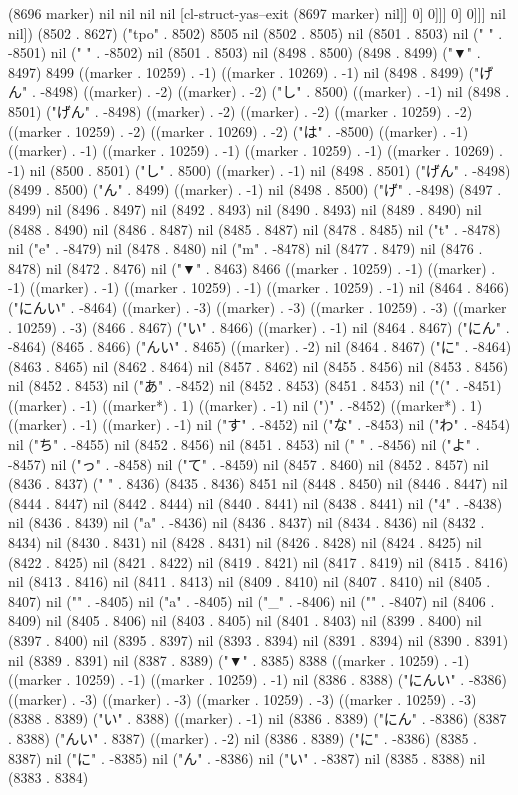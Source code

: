 {{(8696 marker) nil nil nil nil [cl-struct-yas--exit (8697 marker) nil]] 0] 0]]] 0] 0]]] nil nil]) (8502 . 8627) ("tpo" . 8502) 8505 nil (8502 . 8505) nil (8501 . 8503) nil ("
" . -8501) nil (" " . -8502) nil (8501 . 8503) nil (8498 . 8500) (8498 . 8499) ("▼" . 8497) 8499 ((marker . 10259) . -1) ((marker . 10269) . -1) nil (8498 . 8499) ("げん" . -8498) ((marker) . -2) ((marker) . -2) ("し" . 8500) ((marker) . -1) nil (8498 . 8501) ("げん" . -8498) ((marker) . -2) ((marker) . -2) ((marker . 10259) . -2) ((marker . 10259) . -2) ((marker . 10269) . -2) ("は" . -8500) ((marker) . -1) ((marker) . -1) ((marker . 10259) . -1) ((marker . 10259) . -1) ((marker . 10269) . -1) nil (8500 . 8501) ("し" . 8500) ((marker) . -1) nil (8498 . 8501) ("げん" . -8498) (8499 . 8500) ("ん" . 8499) ((marker) . -1) nil (8498 . 8500) ("げ" . -8498) (8497 . 8499) nil (8496 . 8497) nil (8492 . 8493) nil (8490 . 8493) nil (8489 . 8490) nil (8488 . 8490) nil (8486 . 8487) nil (8485 . 8487) nil (8478 . 8485) nil ("t" . -8478) nil ("e" . -8479) nil (8478 . 8480) nil ("m" . -8478) nil (8477 . 8479) nil (8476 . 8478) nil (8472 . 8476) nil ("▼" . 8463) 8466 ((marker . 10259) . -1) ((marker) . -1) ((marker) . -1) ((marker . 10259) . -1) ((marker . 10259) . -1) nil (8464 . 8466) ("にんい" . -8464) ((marker) . -3) ((marker) . -3) ((marker . 10259) . -3) ((marker . 10259) . -3) (8466 . 8467) ("い" . 8466) ((marker) . -1) nil (8464 . 8467) ("にん" . -8464) (8465 . 8466) ("んい" . 8465) ((marker) . -2) nil (8464 . 8467) ("に" . -8464) (8463 . 8465) nil (8462 . 8464) nil (8457 . 8462) nil (8455 . 8456) nil (8453 . 8456) nil (8452 . 8453) nil ("あ" . -8452) nil (8452 . 8453) (8451 . 8453) nil ("(" . -8451) ((marker) . -1) ((marker*) . 1) ((marker) . -1) nil (")" . -8452) ((marker*) . 1) ((marker) . -1) ((marker) . -1) nil ("す" . -8452) nil ("な" . -8453) nil ("わ" . -8454) nil ("ち" . -8455) nil (8452 . 8456) nil (8451 . 8453) nil (" " . -8456) nil ("よ" . -8457) nil ("っ" . -8458) nil ("て" . -8459) nil (8457 . 8460) nil (8452 . 8457) nil (8436 . 8437) (" " . 8436) (8435 . 8436) 8451 nil (8448 . 8450) nil (8446 . 8447) nil (8444 . 8447) nil (8442 . 8444) nil (8440 . 8441) nil (8438 . 8441) nil ("4" . -8438) nil (8436 . 8439) nil ("a" . -8436) nil (8436 . 8437) nil (8434 . 8436) nil (8432 . 8434) nil (8430 . 8431) nil (8428 . 8431) nil (8426 . 8428) nil (8424 . 8425) nil (8422 . 8425) nil (8421 . 8422) nil (8419 . 8421) nil (8417 . 8419) nil (8415 . 8416) nil (8413 . 8416) nil (8411 . 8413) nil (8409 . 8410) nil (8407 . 8410) nil (8405 . 8407) nil ("}" . -8405) nil ("a" . -8405) nil ("_" . -8406) nil ("{" . -8407) nil (8406 . 8409) nil (8405 . 8406) nil (8403 . 8405) nil (8401 . 8403) nil (8399 . 8400) nil (8397 . 8400) nil (8395 . 8397) nil (8393 . 8394) nil (8391 . 8394) nil (8390 . 8391) nil (8389 . 8391) nil (8387 . 8389) ("▼" . 8385) 8388 ((marker . 10259) . -1) ((marker . 10259) . -1) ((marker . 10259) . -1) nil (8386 . 8388) ("にんい" . -8386) ((marker) . -3) ((marker) . -3) ((marker . 10259) . -3) ((marker . 10259) . -3) (8388 . 8389) ("い" . 8388) ((marker) . -1) nil (8386 . 8389) ("にん" . -8386) (8387 . 8388) ("んい" . 8387) ((marker) . -2) nil (8386 . 8389) ("に" . -8386) (8385 . 8387) nil ("に" . -8385) nil ("ん" . -8386) nil ("い" . -8387) nil (8385 . 8388) nil (8383 . 8384) }}
